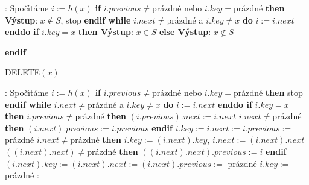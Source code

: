 :\newline 
Spo\v c\'\i t\'ame $i:=h\left(x\right)$\newline 
{\bf if} $i.previous\ne$pr\'azdn\'e nebo $i.key=$pr\'azdn\'e {\bf then V\'ystup}: $
x\notin S$, stop {\bf endif \newline 
while} $i.next\ne$pr\'azdn\'e a $i.key\ne x$ {\bf do} $i:=i.next$ {\bf enddo}\newline 
{\bf if} $i.key=x$ {\bf then V\'ystup}: $x\in S$ {\bf else V\'ystup}: $
x\notin S$ {\bf endif
\medskip

\flushpar DELETE$\left(x\right)$}:\newline 
Spo\v c\'\i t\'ame $i:=h\left(x\right)$\newline 
{\bf if} $i.previous\ne$pr\'azdn\'e nebo $i.key=$pr\'azdn\'e {\bf then} stop {\bf endif\newline 
while} $i.next\ne$pr\'azdn\'e a $i.key\ne x$ {\bf do} $i:=i.next$ {\bf enddo \newline 
if} $i.key=x$ {\bf then\newline} 
\phantom{---}{\bf if} $i.previous\ne$pr\'azdn\'e {\bf then\newline}
\phantom{------}$\left(i.previous\right).next:=i.next$\newline 
\phantom{------}{\bf if} $i.next\ne$pr\'azdn\'e {\bf then} $\left(i.n
ext\right).previous:=i.previous$ {\bf endif\newline} 
\phantom{------}$i.key:=i.next:=i.previous:=$ pr\'azdn\'e \newline 
\phantom{---}{\bf else}\newline 
\phantom{------}{\bf if} $i.next\ne$pr\'azdn\'e {\bf then\newline}
\phantom{---------}$i.key:=\left(i.next\right).key$, $i.next:=\left(i.next\right).next$\newline 
\phantom{---------}{\bf if} $\left(\left(i.next\right).next\right)\ne$pr\'azdn\'e {\bf then} $
\left(\left(i.next\right).next\right).previous:=i$ {\bf endif \newline} 
\phantom{---------}$\left(i.next\right).key:=\left(i.next\right).next:=\left(i.next\right).previous:=$ pr\'azdn\'e \newline 
\phantom{------}{\bf else}\newline 
\phantom{---------}$i.key:=$ pr\'azdn\'e \newline 
\phantom{------}{\bf endif}\newline 
\phantom{---}{\bf endif\newline 
endif
\medskip

\flushpar INSERT$\left(x\right)$}:\newline 
